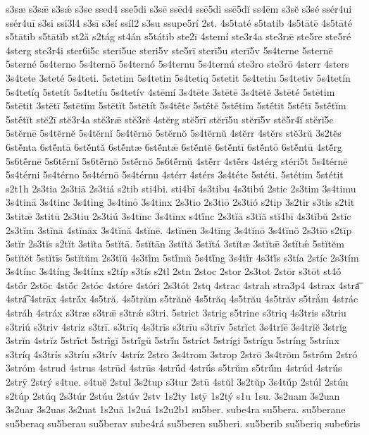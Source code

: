 {s3sæ
s3sǣ
s3sǽ
s3se
ssed4
sse5di
s3sē
ssēd4
ssē5di
ssē5dĭ
ss4ēm
s3sĕ
s3sé
ssér4ui
ssér4uī
s3si
ssi3l4
s3sī
s3sí
ssíl2
s3su
ssupe5rí
2st.
4s5taté
s5tatib
4s5tātē
4s5tāté
s5tātib
s5tātĭb
st2ă
s2tág
st4án
s5tátib
ste2ī
4stemí
ste3r4a
ste3rǣ
ste5re
ste5ré
4sterg
ste3r4i
ster6i5c
steri5ue
steri5v
ste5rī
sterī5u
sterī5v
5s4terne
5sternē
5sterné
5s4terno
5s4ternō
5s4ternó
5s4ternu
5s4ternú
ste3ro
ste3rō
4sterr
4sters
3s4tete
3steté
5s4teti.
5stetim
5s4tetin
5s4tetiq
5stetit
5s4tetiu
5s4tetiv
5s4tetín
5s4tetíq
5stetít
5s4tetíu
5s4tetív
4stēmí
3s4tēte
3stētē
3s4tētĕ
3stēté
5stētim
5stētit
3stētī
5stētĭm
5stētĭt
5stētít
5s4tḗte
5stḗtĕ
5stḗtim
5stḗtit
5stḗtī
5stḗtĭm
5stḗtĭt
stĕ2ī
stĕ3r4a
stĕ3rǣ
stĕ3rĕ
4stĕrg
stĕ5rī
stĕrī5u
stĕrī5v
stĕ5r4ĭ
stĕrĭ5c
5stĕrnē
5s4tĕrnĕ
5s4tĕrnĭ
5s4tĕrnō
5stĕrnŏ
5s4tĕrnŭ
4stĕrr
4stĕrs
stĕ3rŭ
3s2tĕs
6stĕ́nta
6stĕ́ntā
6stĕ́ntă
6stĕ́ntæ
6stĕ́ntǣ
6stĕ́ntĕ
6stĕ́ntī
6stĕ́ntō
6stĕ́ntū
4stĕ́rg
5s6tĕ́rnē
5s6tĕ́rnĭ
5s6tĕ́rnō
5stĕ́rnŏ
5s6tĕ́rnŭ
4stĕ́rr
4stĕ́rs
4stérg
stéri5t
5s4térnē
5s4térni
5s4térno
5s4térnō
5s4térnu
4stérr
4stérs
3s4téte
5stéti.
5stétim
5stétit
s2t1h
2s3tia
2s3tiā
2s3tiá
s2tib
sti4bi.
sti4bī
4s3tibu
4s3tibú
2stic
2s3tim
3s4timu
3s4tinā
3s4tinc
3s4ting
3s4tinō
3s4tinx
2s3tio
2s3tiō
2s3tió
s2tip
3s2tir
s3tis
s2tit
3stitǣ
3stitū
2s3tiu
2s3tiú
3s4tīnc
3s4tīnx
s4tī́nc
2s3tĭā
s3tĭă
stĭ4bī
4s3tĭbŭ
2stĭc
2s3tĭm
3stĭnā
4stĭnāx
3s4tĭnă
4stĭnē.
4stĭnēn
3s4tĭng
3s4tĭnō
3s4tĭnŏ
2s3tĭō
s2tĭp
3stĭr
2s3tĭs
s2tĭt
3stĭta
5stĭtā.
5stĭtān
3stĭtă
3stĭtá
3stĭtæ
3stĭtǣ
3stĭtǽ
5stĭtĕm
5stĭtĕt
5stĭtīs
5stĭtŭm
2s3tĭŭ
4s3tĭ́m
5stĭ́mŭ
5s4tĭ́ng
3s4tĭ́r
4s3tĭ́s
s3tía
2stíc
2s3tím
3s4tínc
3s4tíng
3s4tínx
s2típ
s3tís
s2tl
2stn
2stoc
2stor
2s3tot
2stōr
s3tōt
st4ṓ
4stṓr
2stŏc
4stŏ́c
2stóc
4stóre
4stóri
2s3tót
2stq
4strac
4strah
stra3p4
4strax
4stra͞
4stra͡
4strāx
4strā́x
4s5tră.
4s5trăm
s5trănĕ
4s5trăq
4s5trău
4s5trăv
s5trắm
4strác
4stráh
4stráx
s3træ
s3trǣ
s3trǽ
s3tri.
5strict
3strig
s5trine
s3triq
4s3tris
s3triu
s3triú
s3triv
4striz
s3trī.
s3trīq
4s3trīs
s3trīu
s3trīv
5strĭct
3s4trĭē
3s4trĭĕ
3strĭg
3strĭn
4strĭz
5strĭ́ct
5strĭ́gĭ
5strĭ́gŭ
5strĭ́n
5stríct
5strígi
5strígu
5stríng
5strínx
s3tríq
4s3trís
s3tríu
s3trív
4stríz
2stro
3s4trom
3strop
2strō
3s4trōm
5strṓm
2stró
3stróm
4strud
4strus
4strūd
4strūs
4strū́d
4strū́s
s5trŭm
s5trŭ́m
4strúd
4strús
2strȳ
2strý
s4tue.
s4tuĕ
2stul
3s2tup
s3tur
2stū
4stŭl
3s2tŭp
3s4tŭ́p
2stúl
2stún
s2túp
2stúq
2s3túr
2stúu
2stúv
2stv
1s2ty
1stȳ
1s2tý
s1u
1su.
3s2uam
3s2uan
3s2uar
3s2uas
3s2uat
1s2uā
1s2uá
1s2u2b1
su5ber.
sube4ra
su5bera.
su5berane
su5beraq
su5berau
su5berav
sube4rá
su5beren
su5beri.
su5berib
su5beriq
sube6ris
}
